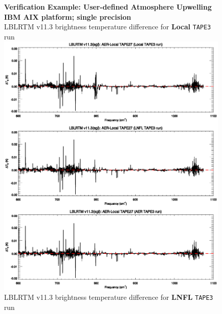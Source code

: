 \begin{figure}[htp]
  \centering
  \qquad\sffamily\textbf{Verification Example: User-defined Atmosphere Upwelling}\\
  \qquad\sffamily\textbf{IBM AIX platform; single precision}\\
  \qquad\textsf{LBLRTM v11.3 brightness temperature difference for \textbf{Local} \texttt{TAPE3} run}\\
  \includegraphics[bb=82 490 534 648,clip,scale=1.0]{graphics/run_example_user_defined_upwelling/ibm/sgl.eps}
  \qquad\textsf{LBLRTM v11.3 brightness temperature difference for \textbf{LNFL} \texttt{TAPE3} run}\\

\end{figure}
